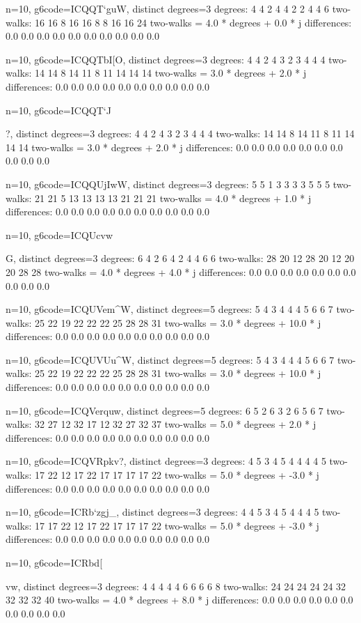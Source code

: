 {{{{{{{{{{{{{{{{{n=10, g6code=ICQQT`guW, distinct degrees=3
degrees: 4 4 2 4 4 2 2 4 4 6 
two-walks: 16 16 8 16 16 8 8 16 16 24 
two-walks = 4.0 * degrees + 0.0 * j
differences: 0.0 0.0 0.0 0.0 0.0 0.0 0.0 0.0 0.0 0.0 

n=10, g6code=ICQQTbI[O, distinct degrees=3
degrees: 4 4 2 4 3 2 3 4 4 4 
two-walks: 14 14 8 14 11 8 11 14 14 14 
two-walks = 3.0 * degrees + 2.0 * j
differences: 0.0 0.0 0.0 0.0 0.0 0.0 0.0 0.0 0.0 0.0 

n=10, g6code=ICQQT`J{?, distinct degrees=3
degrees: 4 4 2 4 3 2 3 4 4 4 
two-walks: 14 14 8 14 11 8 11 14 14 14 
two-walks = 3.0 * degrees + 2.0 * j
differences: 0.0 0.0 0.0 0.0 0.0 0.0 0.0 0.0 0.0 0.0 

n=10, g6code=ICQQUjIwW, distinct degrees=3
degrees: 5 5 1 3 3 3 3 5 5 5 
two-walks: 21 21 5 13 13 13 13 21 21 21 
two-walks = 4.0 * degrees + 1.0 * j
differences: 0.0 0.0 0.0 0.0 0.0 0.0 0.0 0.0 0.0 0.0 

n=10, g6code=ICQUcvw}G, distinct degrees=3
degrees: 6 4 2 6 4 2 4 4 6 6 
two-walks: 28 20 12 28 20 12 20 20 28 28 
two-walks = 4.0 * degrees + 4.0 * j
differences: 0.0 0.0 0.0 0.0 0.0 0.0 0.0 0.0 0.0 0.0 

n=10, g6code=ICQUVem^W, distinct degrees=5
degrees: 5 4 3 4 4 4 5 6 6 7 
two-walks: 25 22 19 22 22 22 25 28 28 31 
two-walks = 3.0 * degrees + 10.0 * j
differences: 0.0 0.0 0.0 0.0 0.0 0.0 0.0 0.0 0.0 0.0 

n=10, g6code=ICQUVUu^W, distinct degrees=5
degrees: 5 4 3 4 4 4 5 6 6 7 
two-walks: 25 22 19 22 22 22 25 28 28 31 
two-walks = 3.0 * degrees + 10.0 * j
differences: 0.0 0.0 0.0 0.0 0.0 0.0 0.0 0.0 0.0 0.0 

n=10, g6code=ICQVerquw, distinct degrees=5
degrees: 6 5 2 6 3 2 6 5 6 7 
two-walks: 32 27 12 32 17 12 32 27 32 37 
two-walks = 5.0 * degrees + 2.0 * j
differences: 0.0 0.0 0.0 0.0 0.0 0.0 0.0 0.0 0.0 0.0 

n=10, g6code=ICQVRpkv?, distinct degrees=3
degrees: 4 5 3 4 5 4 4 4 4 5 
two-walks: 17 22 12 17 22 17 17 17 17 22 
two-walks = 5.0 * degrees + -3.0 * j
differences: 0.0 0.0 0.0 0.0 0.0 0.0 0.0 0.0 0.0 0.0 

n=10, g6code=ICRb`zgj_, distinct degrees=3
degrees: 4 4 5 3 4 5 4 4 4 5 
two-walks: 17 17 22 12 17 22 17 17 17 22 
two-walks = 5.0 * degrees + -3.0 * j
differences: 0.0 0.0 0.0 0.0 0.0 0.0 0.0 0.0 0.0 0.0 

n=10, g6code=ICRbd[}vw, distinct degrees=3
degrees: 4 4 4 4 4 6 6 6 6 8 
two-walks: 24 24 24 24 24 32 32 32 32 40 
two-walks = 4.0 * degrees + 8.0 * j
differences: 0.0 0.0 0.0 0.0 0.0 0.0 0.0 0.0 0.0 0.0 

}}}}}}}}}}}}}}}}
